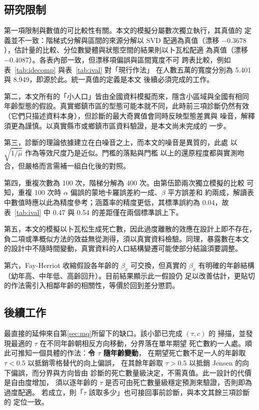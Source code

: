 \documentclass[UTF8, fontset=macnew, a4paper, 12pt]{ctexart}
\newcommand{\cn}[1]{\ding{\number\numexpr171+#1\relax}}
\begin{document}
\subsection{研究限制}

第一項限制與數值的可比較性有關。本文的模擬分屬數次獨立執行，其真值的
定義並不一致：階梯式分解與區間的來源分解以 SVD 配適為真值（漂移
$-0.3678$），估計量的比較、分位數變體與狀態空間的結果則以卜瓦松配適
為真值（漂移 $-0.4087$）。各表內部一致，但漂移項偏誤與區間寬度不可
跨表比較，例如表~\ref{tab:idecomp} 與表~\ref{tab:ival} 對「現行作法」
在人數五萬的寬度分別為 5.401 與 8.949，即源於此。統一真值的定義是本文
後續必須完成的工作。

第二，本文所有的「小人口」皆由全國資料模擬而來，隱含小區域與全國有相同
年齡型態的假設。真實鄉鎮市區的型態可能本就不同，此時前三項診斷仍然有效
（它們只描述資料本身），但診斷\cn{4}的最大奇異值會同時反映型態差異與
噪音，解釋須更為謹慎。以真實縣市或鄉鎮市區資料驗證，是本文尚未完成的
一步。

第三，診斷\cn{4}的理論依據建立在白噪音之上，而本文的噪音是異質的，此處
以 $\sqrt{\overline{1/\hat\mu}}$ 作為等效尺度乃是近似。門檻的落點與門檻
以上的還原程度都與實測吻合，但嚴格而言需補一組白化後的對照。

第四，重複次數為 100 次，階梯分解為 400 次。由第伍節兩次獨立模擬的比較
可知，重複 100 次時 $\alpha$ 偏誤的蒙地卡羅誤差約一成、$\beta$ 平方誤差和
約兩成，解讀表中數值時應以此為精度參考；涵蓋率的精度更低，其標準誤約為
0.04，故表~\ref{tab:ival} 中 0.47 與 0.54 的差距僅在兩個標準誤上下。

第五，本文的模擬以卜瓦松生成死亡數，因此過度離散的效應在設計上即不存在，
負二項或準概似方法的效益無從測得，須以真實資料檢驗。同理，暴露數在本文
的設計中不隨時間變動，真實資料的人口結構變遷可能使部分結論須要調整。

第六，Fay-Herriot 收縮假設各年齡的 $\beta_x$ 可交換，但真實的 $\beta_x$
有明確的年齡結構（幼年高、中年低、高齡回升）。目前結果顯示此一假設仍
足以改善估計，更貼切的作法需引入相鄰年齡的相關性，等價於回到差分懲罰。

\subsection{後續工作}\label{sec:future}

最直接的延伸來自第\ref{sec:mq}所留下的缺口。該小節已完成 $(\tau,c)$ 的
掃描，並發現最適的 $\tau$ 在不同年齡朝相反方向移動，分界落在單年期望
死亡數約一人處。順此可推知一個具體的作法：\textbf{令 $\tau$ 隨年齡變動}，
在期望死亡數不足一人的年齡取 $\tau<0.5$ 以抵銷零格替代的向上偏誤，
在其餘年齡取 $\tau>0.5$ 以抵銷 Jensen 的向下偏誤，而分界與方向皆由
診斷\cn{1}的死亡數量級決定，不需真值。此一設計的代價是自由度增加，
須以逐年齡的 $\tau$ 是否可由死亡數量級穩定預測來驗證，否則即為過度配適。
若成立，則「$\tau$ 該取多少」也可接回事前診斷，與本文其餘三項診斷的
定位一致。
\end{document}
